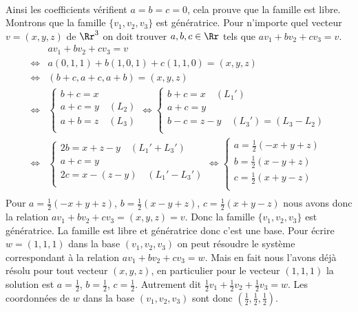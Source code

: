 {\begin{enumerate}
{\begin{align*}
\end{align*}
Ainsi les coefficients vérifient $a=b=c=0$, cela prouve que la famille est libre.
Montrons que la famille $\{ v_1, v_2, v_3\}$ est génératrice. Pour n'importe quel
vecteur $v=(x,y,z)$ de $\Rr^3$ on doit trouver $a,b,c\in\Rr$ tels que $a v_1+b v_2 + c v_3 = v$.
\begin{align*}
  &  a v_1+b v_2 + c v_3 = v \\
\iff & a (0,1,1) + b(1,0,1) + c(1,1,0) = (x,y,z) \\
\iff & (b+c,a+c,a+b)=(x,y,z) \\
\iff & \begin{cases}
       b+c = x \\
       a+c = y \quad (L_2) \\
       a+b = z \quad (L_3) \\
       \end{cases} 
\iff  \begin{cases}
       b+c = x \quad (L_1')\\
       a+c = y \\
       b-c = z-y  \quad(L_3')=(L_3-L_2)\\
       \end{cases} \\
\iff & \begin{cases}
       2b = x+z-y \quad (L_1'+L_3') \\
       a+c = y \\
       2c = x-(z-y) \quad  (L_1'-L_3')  \\
       \end{cases} 
\iff  \begin{cases}
       a = \frac12 (-x+y+z) \\
       b = \frac12 (x-y+z) \\
       c = \frac12 (x+y-z) \\
       \end{cases} \\
\end{align*}
Pour $a= \frac12 (-x+y+z)$, $b= \frac12 (x-y+z)$, $c = \frac12 (x+y-z)$ nous avons donc
la relation $av_1+bv_2+cv_3=(x,y,z)=v$. Donc la famille $\{ v_1, v_2, v_3\}$ est génératrice.
La famille est libre et génératrice  donc c'est une base.
Pour écrire  $w=(1,1,1)$ dans la base $(v_1,v_2,v_3)$  on peut résoudre le système correspondant
à la relation $a v_1+b v_2 + c v_3 = w$.
Mais en fait nous l'avons déjà résolu pour tout vecteur $(x,y,z)$, en particulier pour le vecteur
$(1,1,1)$ la solution est $a=\frac 12$, $b=\frac 12$, $c=\frac 12$.
Autrement dit $\frac 12 v_1+\frac 12 v_2 + \frac 12 v_3 = w$. Les coordonnées de $w$ dans la base $(v_1,v_2,v_3)$
sont donc $(\frac12,\frac12,\frac12)$.
}
\end{enumerate}
}
